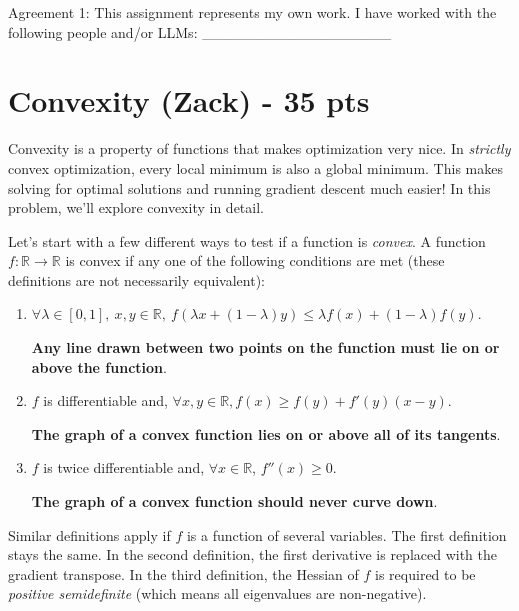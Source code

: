 \documentclass{exam}
\def\R{\mathbb{R}}
\begin{document}
Agreement 1: This assignment represents my own work. I have worked with the following people and/or LLMs: \_\_\_\_\_\_\_\_\_\_\_\_\_\_\_\_\_\_ \\


\newpage

\section{Convexity (Zack) - 35 pts }

Convexity is a property of functions that makes optimization very nice. 
In \textit{strictly} convex optimization, every local minimum is also a global minimum. 
This makes solving for optimal solutions and running gradient descent much easier!
In this problem, we'll explore convexity in detail.

\vspace{3mm}

\noindent Let's start with a few different ways to test if a function is \textit{convex}.
A function $f: \R \to \R$ is convex if any one of the following conditions are met (these definitions are not necessarily equivalent):
\begin{enumerate}
    \item $\forall \lambda \in [0, 1],\  x, y \in \R,\  f(\lambda x + (1-\lambda) y) \leq \lambda f(x) + (1-\lambda)f(y)$. 
    
    \textbf{Any line drawn between two points on the function must lie on or above the function}.

    \item $f$ is differentiable and, $\forall x, y \in \R, f(x) \geq f(y) + f'(y)(x-y)$.

    \textbf{The graph of a convex function lies on or above all of its tangents}.

    \item $f$ is twice differentiable and, $\forall x \in \R$, $f''(x) \geq 0$. 

    \textbf{The graph of a convex function should never curve down}.
\end{enumerate}
Similar definitions apply if $f$ is a function of several variables. 
The first definition stays the same. 
In the second definition, the first derivative is replaced with the gradient transpose.
In the third definition, the Hessian of $f$ is required to be \textit{positive semidefinite} (which means all eigenvalues are non-negative).

\vspace{3mm}
\end{document}
